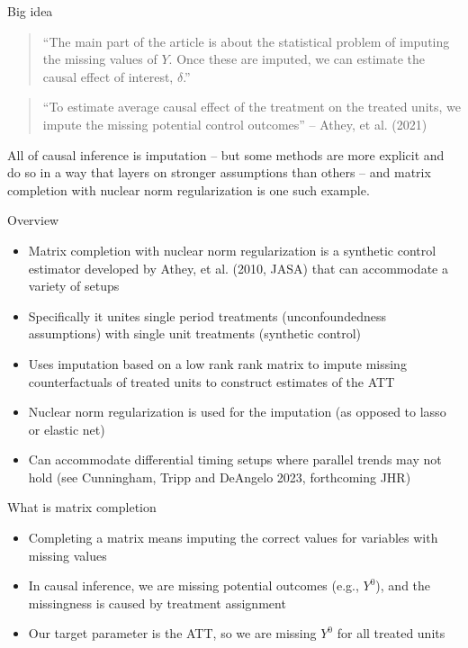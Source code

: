 \documentclass{beamer}
\begin{document}
\begin{frame}{Big idea}

\begin{quote}
``The main part of the article is about the statistical problem of imputing the missing values of $Y$.  Once these are imputed, we can estimate the causal effect of interest, $\delta$.''
\end{quote}

\bigskip

\begin{quote}
``To estimate average causal effect of the treatment on the treated units, we impute the missing potential control outcomes'' -- Athey, et al. (2021)
\end{quote}

\bigskip

All of causal inference is imputation -- but some methods are more explicit and do so in a way that layers on stronger assumptions than others -- and matrix completion with nuclear norm regularization is one such example. 


\end{frame}

\begin{frame}{Overview}

\begin{itemize}
\item Matrix completion with nuclear norm regularization is a synthetic control estimator developed by Athey, et al. (2010, JASA) that can accommodate a variety of setups
\item Specifically it unites single period treatments (unconfoundedness assumptions) with single unit treatments (synthetic control)
\item Uses imputation based on a low rank rank matrix to impute missing counterfactuals of treated units to construct estimates of the ATT
\item Nuclear norm regularization is used for the imputation (as opposed to lasso or elastic net)
\item Can accommodate differential timing setups where parallel trends may not hold (see Cunningham, Tripp and DeAngelo 2023, forthcoming JHR)
\end{itemize}

\end{frame}

\begin{frame}{What is matrix completion}

\begin{itemize}
\item Completing a matrix means imputing the correct values for variables with missing values
\item In causal inference, we are missing potential outcomes (e.g., $Y^0$), and the missingness is caused by treatment assignment
\item Our target parameter is the ATT, so we are missing $Y^0$ for all treated units
\end{itemize}
\end{frame}
\end{document}
